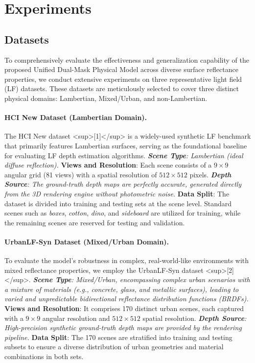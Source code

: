\section{Experiments}

\subsection{Datasets}

To comprehensively evaluate the effectiveness and generalization capability of the proposed Unified Dual-Mask Physical Model across diverse surface reflectance properties, we conduct extensive experiments on three representative light field (LF) datasets. These datasets are meticulously selected to cover three distinct physical domains: Lambertian, Mixed/Urban, and non-Lambertian. 

\paragraph{HCI New Dataset (Lambertian Domain).}
The HCI New dataset <sup>[1]</sup> is a widely-used synthetic LF benchmark that primarily features Lambertian surfaces, serving as the foundational baseline for evaluating LF depth estimation algorithms.
\textit{ \textbf{Scene Type}: Lambertian (ideal diffuse reflection).
} \textbf{Views and Resolution}: Each scene consists of a $9 \times 9$ angular grid (81 views) with a spatial resolution of $512 \times 512$ pixels.
\textit{ \textbf{Depth Source}: The ground-truth depth maps are perfectly accurate, generated directly from the 3D rendering engine without photometric noise.
} \textbf{Data Split}: The dataset is divided into training and testing sets at the scene level. Standard scenes such as \textit{boxes}, \textit{cotton}, \textit{dino}, and \textit{sideboard} are utilized for training, while the remaining scenes are reserved for testing and validation.

\paragraph{UrbanLF-Syn Dataset (Mixed/Urban Domain).}
To evaluate the model's robustness in complex, real-world-like environments with mixed reflectance properties, we employ the UrbanLF-Syn dataset <sup>[2]</sup>.
\textit{ \textbf{Scene Type}: Mixed/Urban, encompassing complex urban scenarios with a mixture of materials (e.g., concrete, glass, and metallic surfaces), leading to varied and unpredictable bidirectional reflectance distribution functions (BRDFs).
} \textbf{Views and Resolution}: It comprises 170 distinct urban scenes, each captured with a $9 \times 9$ angular resolution and $512 \times 512$ spatial resolution.
\textit{ \textbf{Depth Source}: High-precision synthetic ground-truth depth maps are provided by the rendering pipeline.
} \textbf{Data Split}: The 170 scenes are stratified into training and testing subsets to ensure a diverse distribution of urban geometries and material combinations in both sets.

